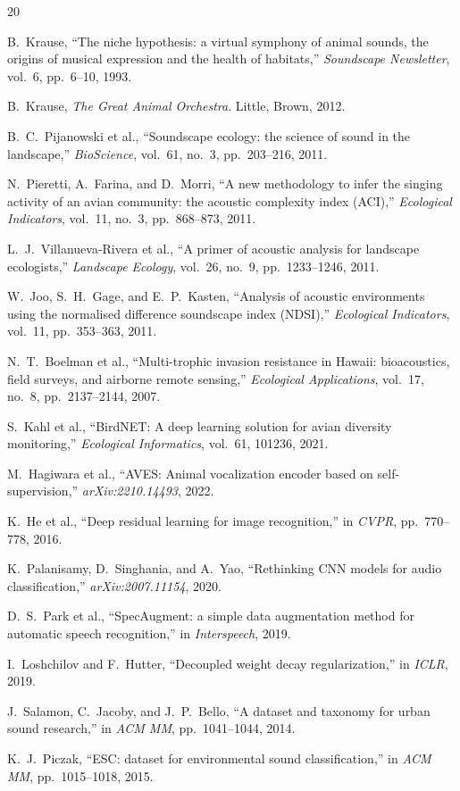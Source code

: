 \documentclass[10pt,twocolumn]{article}
\begin{document}
\begin{thebibliography}{20}
\small

B.\ Krause, ``The niche hypothesis: a virtual symphony of animal sounds,
the origins of musical expression and the health of habitats,''
\textit{Soundscape Newsletter}, vol.\ 6, pp.\ 6–10, 1993.

B.\ Krause, \textit{The Great Animal Orchestra}.
Little, Brown, 2012.

B.\ C.\ Pijanowski et al., ``Soundscape ecology: the science of sound
in the landscape,'' \textit{BioScience}, vol.\ 61, no.\ 3, pp.\ 203–216,
2011.

N.\ Pieretti, A.\ Farina, and D.\ Morri, ``A new methodology to infer
the singing activity of an avian community: the acoustic complexity index
(ACI),'' \textit{Ecological Indicators}, vol.\ 11, no.\ 3,
pp.\ 868–873, 2011.

L.\ J.\ Villanueva-Rivera et al., ``A primer of acoustic analysis for
landscape ecologists,'' \textit{Landscape Ecology}, vol.\ 26, no.\ 9,
pp.\ 1233–1246, 2011.

W.\ Joo, S.\ H.\ Gage, and E.\ P.\ Kasten, ``Analysis of acoustic
environments using the normalised difference soundscape index (NDSI),''
\textit{Ecological Indicators}, vol.\ 11, pp.\ 353–363, 2011.

N.\ T.\ Boelman et al., ``Multi-trophic invasion resistance in Hawaii:
bioacoustics, field surveys, and airborne remote sensing,''
\textit{Ecological Applications}, vol.\ 17, no.\ 8,
pp.\ 2137–2144, 2007.

S.\ Kahl et al., ``BirdNET: A deep learning solution for avian diversity
monitoring,'' \textit{Ecological Informatics}, vol.\ 61, 101236, 2021.

M.\ Hagiwara et al., ``AVES: Animal vocalization encoder based on
self-supervision,'' \textit{arXiv:2210.14493}, 2022.

K.\ He et al., ``Deep residual learning for image recognition,''
in \textit{CVPR}, pp.\ 770–778, 2016.

K.\ Palanisamy, D.\ Singhania, and A.\ Yao, ``Rethinking CNN models for
audio classification,'' \textit{arXiv:2007.11154}, 2020.

D.\ S.\ Park et al., ``SpecAugment: a simple data augmentation method
for automatic speech recognition,'' in \textit{Interspeech}, 2019.

I.\ Loshchilov and F.\ Hutter, ``Decoupled weight decay regularization,''
in \textit{ICLR}, 2019.

J.\ Salamon, C.\ Jacoby, and J.\ P.\ Bello, ``A dataset and taxonomy
for urban sound research,'' in \textit{ACM MM}, pp.\ 1041–1044, 2014.

K.\ J.\ Piczak, ``ESC: dataset for environmental sound classification,''
in \textit{ACM MM}, pp.\ 1015–1018, 2015.

\end{thebibliography}
\end{document}
